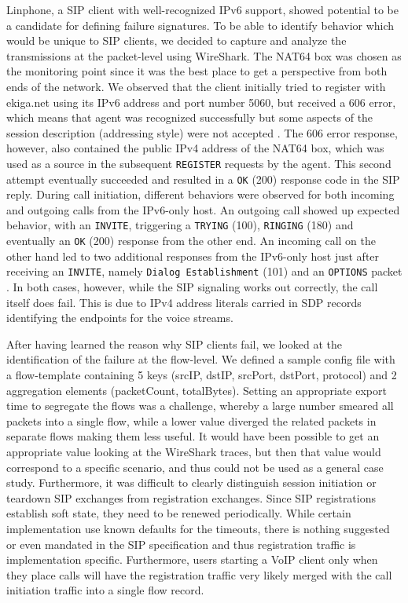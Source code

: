 \documentclass{llncs}
\begin{document}
Linphone, a SIP client with well-recognized IPv6 support, showed potential to be a candidate for defining failure signatures. To be able to identify behavior which would be unique to SIP clients, we decided to capture and analyze the transmissions at the packet-level using WireShark. The NAT64 box was chosen as the monitoring point since it was the best place to get a perspective from both ends of the network. We observed that the client initially tried to register with ekiga.net using its IPv6 address and port number 5060, but received a 606 error, which means that agent was recognized successfully but some aspects of the session description (addressing style) were not accepted \cite{rfc3261}. The 606 error response, however, also contained the public IPv4 address of the NAT64 box, which was used as a source in the subsequent \texttt{REGISTER} requests by the agent. This second attempt eventually succeeded and resulted in a \texttt{OK} (200) response code in the SIP reply. During call initiation, different behaviors were observed for both incoming and outgoing calls from the IPv6-only host. An outgoing call showed up expected behavior, with an \texttt{INVITE}, triggering a \texttt{TRYING} (100), \texttt{RINGING} (180) and eventually an \texttt{OK} (200) response from the other end. An incoming call on the other hand led to two additional responses from the IPv6-only host just after receiving an \texttt{INVITE}, namely \texttt{Dialog Establishment} (101) and an \texttt{OPTIONS} packet \cite{rfc3261}. In both cases, however, while the SIP signaling works out correctly, the call itself does fail. This is due to IPv4 address literals carried in SDP records identifying the endpoints for the voice streams.

After having learned the reason why SIP clients fail, we looked at the identification of the failure at the flow-level. We defined a sample config file with a flow-template containing 5 keys (srcIP, dstIP, srcPort, dstPort, protocol) and 2 aggregation elements (packetCount, totalBytes). Setting an appropriate export time to segregate the flows was a challenge, whereby a large number smeared all packets into a single flow, while a lower value diverged the related packets in separate flows making them less useful. It would have been possible to get an appropriate value looking at the WireShark traces, but then that value would correspond to a specific scenario, and thus could not be used as a general case study. Furthermore, it was difficult to clearly distinguish session initiation or teardown SIP exchanges from registration exchanges. Since SIP registrations establish soft state, they need to be renewed periodically. While certain implementation use known defaults for the timeouts, there is nothing suggested or even mandated in the SIP specification and thus registration traffic is implementation specific. Furthermore, users starting a VoIP client only when they place calls will have the registration traffic very likely merged with the call initiation traffic into a single flow record.
\end{document}
